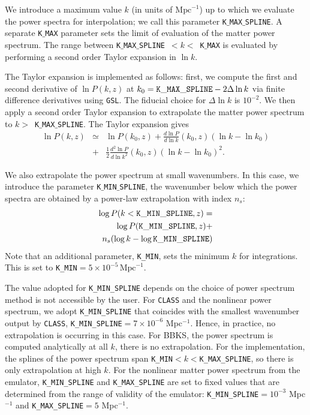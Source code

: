 \documentclass[\docopts]{\docclass}
\begin{document}
We introduce a maximum value $k$ (in units of $\text{Mpc}^{-1}$) up to which we evaluate the power spectra for interpolation; we call this parameter {\tt K$\_$MAX$\_$SPLINE}. A separate {\tt K$\_$MAX} parameter sets the limit of evaluation of the matter power spectrum. The range between {\tt K$\_$MAX$\_$SPLINE}~$<k<$~{\tt K$\_$MAX} is evaluated by performing a second order Taylor expansion in $\ln k$.

The Taylor expansion is implemented as follows: first, we compute the first and second derivative of $\ln P(k,z)$ at $k_0={\rm \tt K\_MAX\_SPLINE}-2\Delta\ln k$ via finite difference derivatives using {\tt GSL}. The fiducial choice for $\Delta\ln k$ is $10^{-2}$. We then apply a second order Taylor expansion to extrapolate the matter power spectrum to $k>$~{\tt K$\_$MAX$\_$SPLINE}. The Taylor expansion gives
%
\begin{eqnarray}
  \ln P(k,z) &\simeq& \ln P(k_0,z) + \frac{d\ln P}{d\ln k}(k_0,z) (\ln k-\ln k_0)  \nonumber\\
  &+& \frac{1}{2}  \frac{d^2\ln P}{d\ln k^2}(k_0,z) (\ln k-\ln k_0)^2.
  \label{eq:NLPSTaylor}
\end{eqnarray}

We also extrapolate the power spectrum at small wavenumbers. In this case, we introduce the parameter {\tt K$\_$MIN$\_$SPLINE}, the wavenumber below which the power spectra are obtained by a power-law extrapolation with index $n_s$:
\begin{eqnarray}
  \log P(k<{\tt K\_MIN\_SPLINE},z) = \nonumber\\
  \log P({\tt K\_MIN\_SPLINE},z) + \nonumber\\
  n_s (\log k-\log{\tt K\_MIN\_SPLINE})
\end{eqnarray}
Note that an additional parameter, {\tt K\_MIN}, sets the minimum $k$ for integrations. This is set to {\tt K\_MIN}$=5\times 10^{-5}\,\text{Mpc}^{-1}$.

The value adopted for {\tt K\_MIN\_SPLINE} depends on the choice of power spectrum method is not accessible by the user. For {\tt CLASS} and the nonlinear power spectrum, we adopt {\tt K\_MIN\_SPLINE} that coincides with the smallest wavenumber output by {\tt CLASS}, {\tt K\_MIN\_SPLINE}$=7\times 10^{-6}$ Mpc$^{-1}$. Hence, in practice, no extrapolation is occurring in this case. For BBKS, the power spectrum is computed analytically at all $k$, there is no extrapolation. For the \citet{1998ApJ...496..605E} implementation, the splines of the power spectrum span {\tt K\_MIN}$<k<${\tt K\_MAX\_SPLINE}, so there is only extrapolation at high $k$. For the nonlinear matter power spectrum from the emulator, {\tt K\_MIN\_SPLINE} and {\tt K\_MAX\_SPLINE} are set to fixed values that are determined from the range of validity of the emulator:  {\tt K\_MIN\_SPLINE}$=10^{-3}$ Mpc$^{-1}$ and {\tt K\_MAX\_SPLINE}$=5$ Mpc$^{-1}$.
\end{document}

